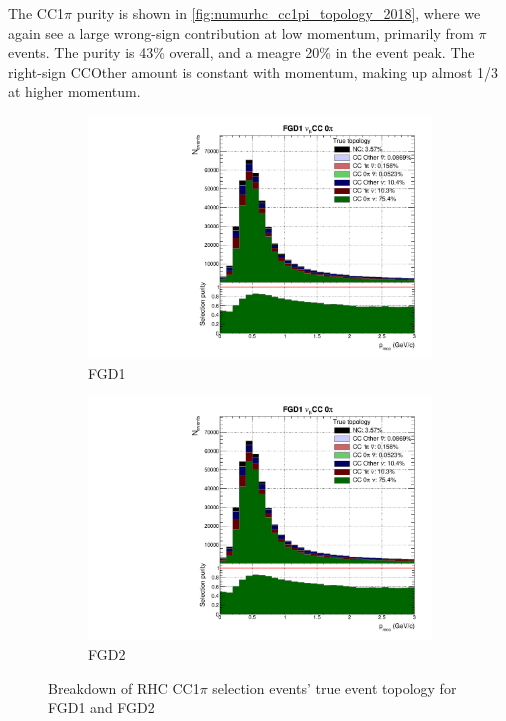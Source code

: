 The CC1$\pi$ purity is shown in \autoref{fig:numurhc_cc1pi_topology_2018}, where we again see a large wrong-sign contribution at low momentum, primarily from $\pi$ events. The purity is 43\% overall, and a meagre 20\% in the event peak. The right-sign CCOther amount is constant with momentum, making up almost 1/3 at higher momentum.
\begin{figure}[h]
	\begin{subfigure}[t]{0.49\textwidth}
		\includegraphics[width=\textwidth,page=27, trim={0mm 0mm 0mm 9mm}, clip]{figures/mach3/2018/Selection/2018_RedNDmatrix_rebin_verbose_may_noweights_diagnostics}
		\caption{FGD1}
	\end{subfigure}
	\begin{subfigure}[t]{0.49\textwidth}
		\includegraphics[width=\textwidth,page=33, trim={0mm 0mm 0mm 9mm}, clip]{figures/mach3/2018/Selection/2018_RedNDmatrix_rebin_verbose_may_noweights_diagnostics}
		\caption{FGD2}
	\end{subfigure}
	\caption{Breakdown of \numu RHC CC1$\pi$ selection events' true event topology for FGD1 and FGD2 }
	\label{fig:numurhc_cc1pi_topology_2018}
\end{figure}

